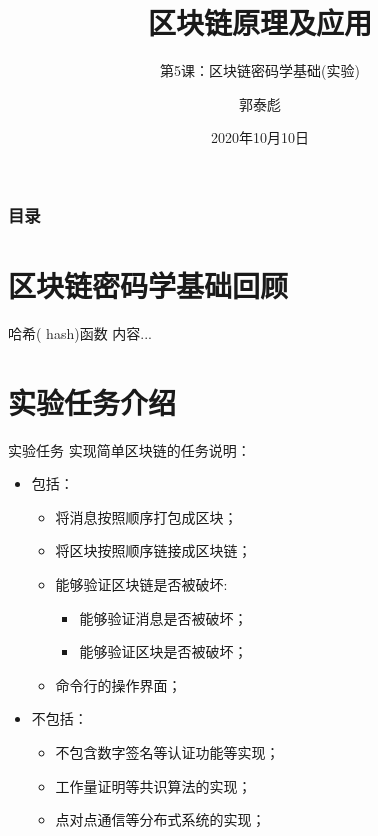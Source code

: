 \documentclass[11pt]{beamer}
\author{郭泰彪}
\title{区块链原理及应用}
\subtitle{第5课：区块链密码学基础(实验)}
\institute[湖工商大数据研究院]{湖南工商大学大数据与互联网创新研究院}
\date{2020年10月10日}
\begin{document}
\begin{frame}[plain]
	\maketitle
\end{frame}

\begin{frame}
	\frametitle{目录}
	\begin{multicols}{2}
	\tableofcontents[sectionstyle=show,subsectionstyle=show/shaded]
	\end{multicols}
\end{frame}

\section{区块链密码学基础回顾}

\begin{frame}{哈希( hash)函数}
	内容... %
\end{frame}

\section{实验任务介绍}

\begin{frame}{实验任务}
	实现简单区块链的任务说明：
	\begin{itemize}
		\item 包括：
		\begin{itemize}
			\item 将消息按照顺序打包成区块；
			\item 将区块按照顺序链接成区块链；
				\item 能够验证区块链是否被破坏:
			\begin{itemize}
				\item 能够验证消息是否被破坏；
			\item 能够验证区块是否被破坏；
			\end{itemize}	
		\item 命令行的操作界面；
		\end{itemize}
	\item 不包括：
	\begin{itemize}
		\item 不包含数字签名等认证功能等实现；
		\item 工作量证明等共识算法的实现；
		\item 点对点通信等分布式系统的实现；
	\end{itemize}
	\end{itemize}
\end{frame}
\end{document}
